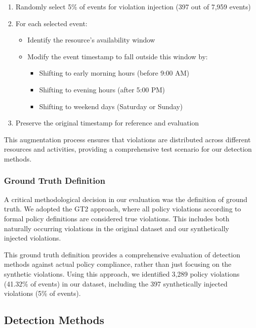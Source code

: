 \begin{enumerate}
    \item Randomly select 5\% of events for violation injection (397 out of 7,959 events)
    \item For each selected event:
        \begin{itemize}
            \item Identify the resource's availability window
            \item Modify the event timestamp to fall outside this window by:
                \begin{itemize}
                    \item Shifting to early morning hours (before 9:00 AM)
                    \item Shifting to evening hours (after 5:00 PM)
                    \item Shifting to weekend days (Saturday or Sunday)
                \end{itemize}
        \end{itemize}
    \item Preserve the original timestamp for reference and evaluation
\end{enumerate}

This augmentation process ensures that violations are distributed across different resources and activities, providing a comprehensive test scenario for our detection methods.

\subsubsection{Ground Truth Definition}
A critical methodological decision in our evaluation was the definition of ground truth. We adopted the GT2 approach, where all policy violations according to formal policy definitions are considered true violations. This includes both naturally occurring violations in the original dataset and our synthetically injected violations.

This ground truth definition provides a comprehensive evaluation of detection methods against actual policy compliance, rather than just focusing on the synthetic violations. Using this approach, we identified 3,289 policy violations (41.32\% of events) in our dataset, including the 397 synthetically injected violations (5\% of events).

\subsection{Detection Methods}

